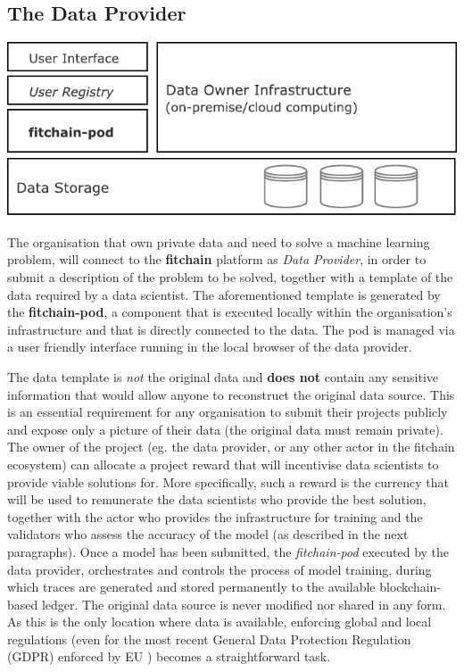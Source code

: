 \documentclass[12pt, a4paper,titlepage]{extreport}
\begin{document}
\subsection{The Data Provider}

\begin{center}
\includegraphics[scale=1]{pod_dataowner.pdf} 
\end{center}

The organisation that own private data and need to solve a machine learning problem, will connect to the \textbf{fitchain} platform as \emph{Data Provider}, in order to submit a description of the problem to be solved, together with a template of the data required by a data scientist. 
The aforementioned template is generated by the \textbf{fitchain-pod}, a component that is executed locally within the organisation's infrastructure and that is directly connected to the data. The pod is managed via a user friendly interface running in the local browser of the data provider.
 
The data template is \textit{not} the original data and \textbf{does not} contain any sensitive information that would allow anyone to reconstruct the original data source. This is an essential requirement for any organisation to submit their projects publicly and expose only a picture of their data (the original data must remain private).
The owner of the project (eg. the data provider, or any other actor in the fitchain ecosystem) can allocate a project reward that will incentivise data scientists to provide viable solutions for. More specifically, such a reward is the currency that will be used to remunerate the data scientists who provide the best solution, together with the actor who provides the infrastructure for training and the validators who assess the accuracy of the model (as described in the next paragraphs).
Once a model has been submitted, the \textit{fitchain-pod} executed by the data provider, orchestrates and controls the process of model training, during which traces are generated and stored permanently to the available blockchain-based ledger.
The original data source is never modified nor shared in any form. As this is the only location where data is available, enforcing global and local regulations (even for the most recent General Data Protection Regulation (GDPR) enforced by EU \cite{GDPR}) becomes a straightforward task.
\end{document}
